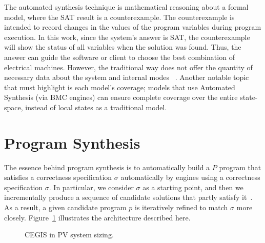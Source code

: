 \documentclass[review]{elsarticle}
\begin{document}
The automated synthesis technique is mathematical reasoning about a formal model, where the SAT result is a counterexample. The counterexample is intended to record changes in the values of the program variables during program execution. In this work, since the system's answer is SAT, the counterexample will show the status of all variables when the solution was found. Thus, the answer can guide the software or client to choose the best combination of electrical machines. However, the traditional way does not offer the quantity of necessary data about the system and internal modes ~\citep{Benatiallah2017,Pradhan,Swarnkar}. Another notable topic that must highlight is each model's coverage; models that use Automated Synthesis (via BMC engines) can ensure complete coverage over the entire state-space, instead of local states as a traditional model.

\section{Program Synthesis}
\label{sec:Synthesis}

The essence behind program synthesis is to automatically build a $P$ program that satisfies a correctness specification $\sigma$ automatically by engines using a correctness specification $\sigma$. In particular, we consider $\sigma$ as a starting point, and then we incrementally produce a sequence of candidate solutions that partly satisfy it~\citep{Abateetal2017}. As a result, a given candidate program $p$ is iteratively refined to match $\sigma$ more closely. Figure~\ref{Counter-Example-Guided-Inductive-Synthesis} illustrates the architecture described here.

%
\begin{figure}[ht]
\begin{center}
\end{center}
	\caption{CEGIS in PV system sizing.}
	\label{Counter-Example-Guided-Inductive-Synthesis}
\end{figure}
\end{document}
